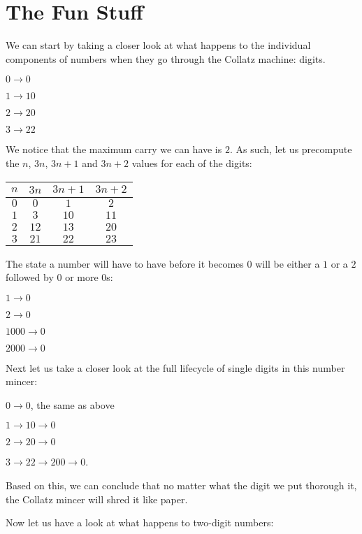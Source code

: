 \documentclass[10pt,a4paper,showpacs,nofootinbib,aps,superscriptaddress,eqsecnum,prd,showkeys,twocolumn,notitlepage]{article}
\begin{document}
\section{The Fun Stuff}

We can start by taking a closer look at what happens to the individual components of numbers when they go through the Collatz machine: digits.

$0 \rightarrow 0$

$1 \rightarrow 10$

$2 \rightarrow 20$

$3 \rightarrow 22$

We notice that the maximum carry we can have is $2$. As such, let us precompute the $n$, $3n$, $3n+1$ and $3n+2$ values for each of the digits:

\begin{center}
\begin{tabular}{||c c c c||}
\hline
$n$ & $3n$ & $3n + 1$ & $3n + 2$ \\ [0.5ex]
\hline
\hline
$0$ & $0$ & $1$ & $2$\\
\hline
$1$ & $3$ & $10$ & $11$\\
\hline
$2$ & $12$ & $13$ & $20$\\
\hline
$3$ & $21$ & $22$ & $23$\\
\hline
\end{tabular}
\end{center}

The state a number will have to have before it becomes $0$ will be either a $1$ or a $2$ followed by 0 or more $0$s:

$1 \rightarrow 0$ 

$2 \rightarrow 0$

$1000 \rightarrow 0$

$2000 \rightarrow 0$

Next let us take a closer look at the full lifecycle of single digits in this number mincer:   

$0 \rightarrow 0$, the same as above 

$1 \rightarrow 10 \rightarrow 0$

$2 \rightarrow 20 \rightarrow 0$

$3 \rightarrow 22 \rightarrow 200 \rightarrow 0$.

Based on this, we can conclude that no matter what the digit we put thorough it, the Collatz mincer will shred it like paper.

Now let us have a look at what happens to two-digit numbers:
\end{document}
